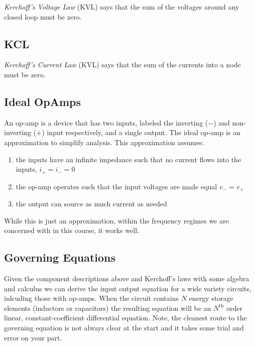 \textit{Kerchoff's Voltage Law} (KVL) says that the sum of the voltages around any closed loop must be zero.

\subsection*{KCL}

\textit{Kerchoff's Current Law} (KVL) says that the sum of the currents into a node must be zero.

\subsection*{Ideal OpAmps}

An op-amp is a device that has two inputs, labeled the inverting ($-$) and non-inverting ($+$) input respectively, and a single output. The ideal op-amp is an approximation to simplify analysis. This approximation assumes:

\begin{enumerate}
\item the inputs have an infinite impedance such that no current flows into the inputs, $i_+ = i_- = 0$
\item the op-amp operates such that the input voltages are made equal $v_- = v_+$
\item the output can source as much current as needed
\end{enumerate}
 
While this is just an approximation, within the frequency regimes we are concerned with in this course, it works well. 

\subsection*{Governing Equations}

Given the component descriptions above and Kerchoff's laws with some algebra and calculus we can derive the input output equation for a wide variety circuits, inlcuding those with op-amps. When the circuit contains $N$ energy storage elements (inductors or capacitors) the resulting equation will be an $N^\text{th}$ order linear, constant-coefficient differential equation. Note, the cleanest route to the governing equation is not always clear at the start and it takes some trial and error on your part.

